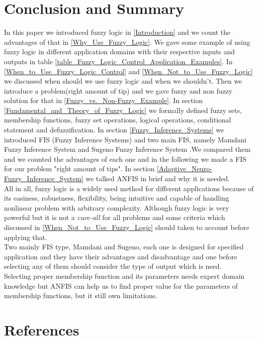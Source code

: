 \documentclass{article}
\begin{document}
\section{Conclusion and Summary}
In this paper we introduced fuzzy logic in \ref{Introduction} and we count the advantages of that in \ref{Why_Use_Fuzzy_Logic}. We gave some example of using fuzzy logic in different application domains with their respective inputs and outputs in table \ref{table_Fuzzy_Logic_Control_Application_Examples}.
In \ref{When_to_Use_Fuzzy_Logic_Control} and \ref{When_Not_to_Use_Fuzzy_Logic} we discussed when should we use fuzzy logic and when we shouldn't.
Then we introduce a problem(right amount of tip) and we gave fuzzy and non fuzzy solution for that
in \ref{Fuzzy_vs._Non-Fuzzy_Example}.
In section \ref{Fundamental_and_Theory_of_Fuzzy_Logic} we formally defined fuzzy sets, membership functions,
fuzzy set operations, logical operations, conditional statement and defuzzification.
In section \ref{Fuzzy_Inference_Systems} we introduced FIS (Fuzzy Inference Systems) and two main FIS, namely Mamdani Fuzzy Inference System and Sugeno Fuzzy Inference System
.We compared them and we counted the advantages of each one and in the following 
we made a FIS for our problem "right amount of tips".
In section \ref{Adaptive_Neuro-Fuzzy_Inference_System} we talked ANFIS in brief and why it is needed.
\\
All in all, fuzzy logic is a widely used method for different applications
because of its easiness, robustness, flexibility, being intuitive and  capable of handling nonlinear problem with arbitrary complexity. 
Although fuzzy logic is very powerful but it is  not a \textit{cure-all} for all problems and some criteria which discussed in \ref{When_Not_to_Use_Fuzzy_Logic} should taken to account before applying that.
\\
Two mainly FIS type, Mamdani and Sugeno, each one is designed for specified application and they have their advantages and disadvantage and one before selecting any of them should consider the type of output which is need.
\\Selecting proper membership function and its parameters needs expert domain knowledge but ANFIS can 
help us to find proper value for the parameters of membership functions, but it still own limitations.  

\section{References }

%


\end{document}
